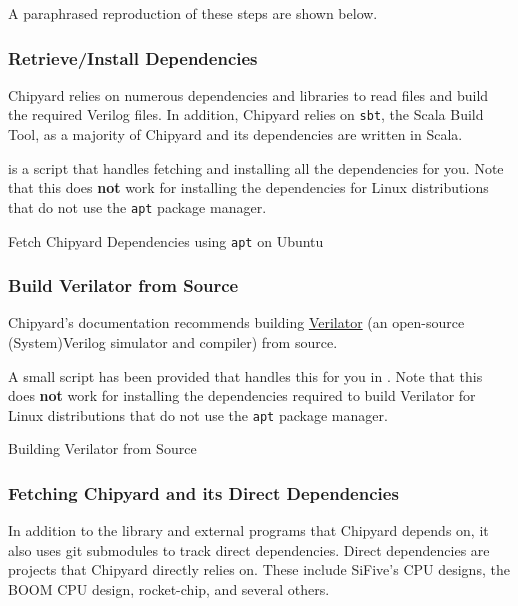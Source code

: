A paraphrased reproduction of these steps are shown below.

\subsubsection{Retrieve/Install Dependencies}\label{sec:Retrive_Install_Dependencies}
Chipyard relies on numerous dependencies and libraries to read files and build the required Verilog files.
In addition, Chipyard relies on \texttt{sbt}, the Scala Build Tool, as a majority of Chipyard and its dependencies are written in Scala.

 is a script that handles fetching and installing all the dependencies for you.
Note that this does \textbf{not} work for installing the dependencies for Linux distributions that do not use the \texttt{apt} package manager.

\begin{listing}[h!tbp]
\caption{Fetch Chipyard Dependencies using \texttt{apt} on Ubuntu}
\label{lst:Ubuntu_Chipyard_Deps_Setup}
\end{listing}

\subsubsection{Build Verilator from Source}\label{sec:Build_Verilator_from_Source}
Chipyard's documentation recommends building \href{https://www.veripool.org/wiki/verilator}{Verilator} (an open-source (System)Verilog simulator and compiler) from source.

A small script has been provided that handles this for you in .
Note that this does \textbf{not} work for installing the dependencies required to build Verilator for Linux distributions that do not use the \texttt{apt} package manager.

\begin{listing}[h!tbp]
\caption{Building Verilator from Source}
\label{lst:Build_Verilator_from_Source}
\end{listing}

\subsubsection{Fetching Chipyard and its Direct Dependencies}\label{sec:Fetching_Chipyard_Direct_Dependencies}
In addition to the library and external programs that Chipyard depends on, it also uses git submodules to track direct dependencies.
Direct dependencies are projects that Chipyard directly relies on.
These include SiFive's CPU designs, the BOOM CPU design, rocket-chip, and several others.

